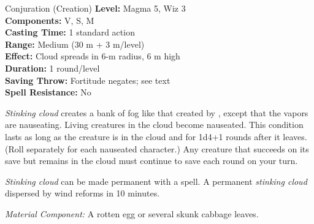 {Conjuration (Creation)}
{
	\textbf{Level:}
	Magma 5, Wiz 3\\
	\textbf{Components:}
	V, S, M\\
	\textbf{Casting Time:}
	1 standard action\\
	\textbf{Range:}
	Medium (30 m + 3 m/level)\\
	\textbf{Effect:}
	Cloud spreads in 6-m radius, 6 m high\\
	\textbf{Duration:}
	1 round/level\\
	\textbf{Saving Throw:}
	Fortitude negates; see text\\
	\textbf{Spell Resistance:}
	No\\
}
{
	\emph{Stinking cloud} creates a bank of fog like that created by , except that the vapors are nauseating. Living creatures in the cloud become nauseated. This condition lasts as long as the creature is in the cloud and for 1d4+1 rounds after it leaves. (Roll separately for each nauseated character.) Any creature that succeeds on its save but remains in the cloud must continue to save each round on your turn.

	\emph{Stinking cloud} can be made permanent with a  spell. A permanent \emph{stinking cloud} dispersed by wind reforms in 10 minutes.

	\textit{Material Component:}
	A rotten egg or several skunk cabbage leaves.

}
